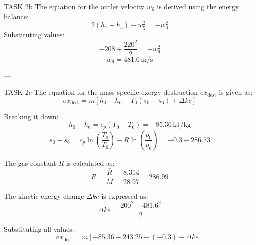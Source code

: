 TASK 2b  
The equation for the outlet velocity \( w_6 \) is derived using the energy balance:  
\[
2(h_1 - h_5) - w_5^2 = -w_6^2
\]  
Substituting values:  
\[
-208 + \frac{220^2}{2} = -w_6^2
\]  
\[
w_6 = 481.6 \, \text{m/s}
\]  

---

TASK 2c  
The equation for the mass-specific exergy destruction \( ex_{\text{dest}} \) is given as:  
\[
ex_{\text{dest}} = \dot{m} \left[ h_0 - h_6 - T_0(s_0 - s_6) + \Delta ke \right]
\]  

Breaking it down:  
\[
h_0 - h_6 = c_p(T_0 - T_6) = -85.36 \, \text{kJ/kg}
\]  
\[
s_0 - s_6 = c_p \ln\left(\frac{T_0}{T_6}\right) - R \ln\left(\frac{p_0}{p_6}\right) = -0.3 - 286.53
\]  

The gas constant \( R \) is calculated as:  
\[
R = \frac{\bar{R}}{M} = \frac{8.314}{28.97} = 286.99
\]  

The kinetic energy change \( \Delta ke \) is expressed as:  
\[
\Delta ke = \frac{200^2 - 481.6^2}{2}
\]  

Substituting all values:  
\[
ex_{\text{dest}} = \dot{m} \left[ -85.36 - 243.25 - (-0.3) - \Delta ke \right]
\]  